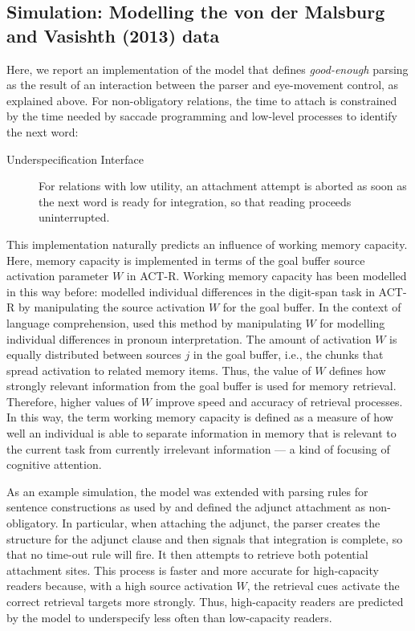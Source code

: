 \documentclass{cambridge7A}\usepackage[]{graphicx}\usepackage[]{color}
\begin{document}
\subsection{Simulation: Modelling the von der Malsburg and Vasishth (2013) data}
Here, we report an implementation of the model that defines \emph{good-enough} parsing as the result of an interaction between the parser and eye-movement control, as explained above. For non-obligatory relations, the time to attach is constrained by the time needed by saccade programming and low-level processes to identify the next word:

\begin{description}
  \item[Underspecification Interface]  For relations with low utility, an attachment attempt is aborted as soon as the next word is ready for integration, so that reading proceeds uninterrupted.
\end{description}

This implementation naturally predicts an influence of working memory capacity. Here, memory capacity is implemented in terms of the  goal buffer source activation parameter $W$ in ACT-R.
Working memory capacity has been modelled in this way before: \cite{DailyLovettReder2001} modelled individual differences in the digit-span task \citep{LovettRederLebiere1999} in ACT-R by manipulating the source activation $W$ for the goal buffer.  
In the context of language comprehension, \cite{VanRijVanRijnHendriks2013} used this method by manipulating $W$ for modelling individual differences in pronoun interpretation.
The amount of activation $W$ is equally distributed between sources $j$ in the goal buffer, i.e., the chunks that spread activation to related memory items. Thus, the value of $W$ defines how strongly relevant information from the goal buffer is used for memory retrieval. Therefore, higher values of $W$ improve speed and accuracy of retrieval processes. In this way, the term working memory capacity  is defined as a measure of how well an individual is able to separate information in memory that is relevant to the current task from currently irrelevant information --- a kind of focusing of cognitive attention.

As an example simulation, the \cite{LewisVasishth2005} model was extended with parsing rules for sentence constructions as used by \cite{MalsburgVasishth2013} and defined the adjunct attachment as non-obligatory.
In particular, when attaching the adjunct, the parser creates the structure for the adjunct clause and then signals that integration is complete, so that no time-out rule will fire. It then attempts to retrieve both potential attachment sites. 
This process is faster and more accurate for high-capacity readers because, with a high source activation $W$, the retrieval cues  
activate the correct retrieval targets more strongly.
Thus, high-capacity readers are predicted by the model to underspecify less often than low-capacity readers.
\end{document}
